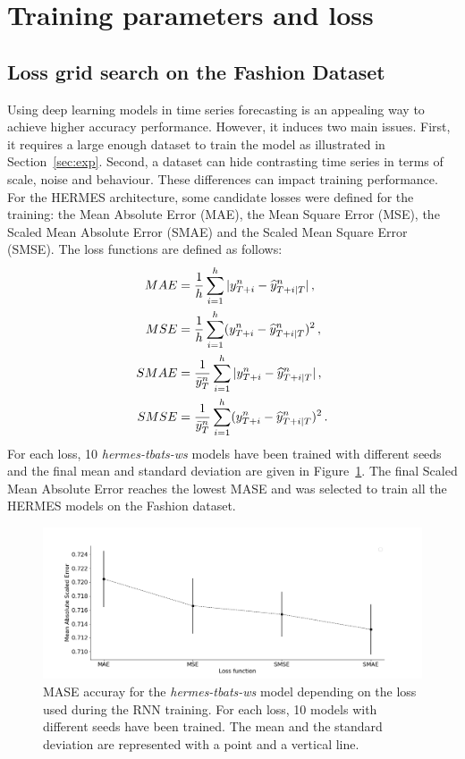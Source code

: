 \documentclass[10pt]{article} %
\newcommand{\ts}{y}
\newcommand{\tspred}{\widehat{\ts}}
\newcommand{\lag}{h}
\newcommand{\meants}{\Bar{\ts}}
\begin{document}
\section{Training parameters and loss}

\subsection{Loss grid search on the Fashion Dataset}
\label{sec:fashiongridsearch}

Using deep learning models in time series forecasting is an appealing way to achieve higher accuracy performance. However, it induces two main issues. First, it requires a large enough dataset to train the model as illustrated in Section~\ref{sec:exp}. Second, a dataset can hide contrasting time series in terms of scale, noise and behaviour. These differences can impact training performance. For the HERMES architecture, some candidate losses were defined for the training: the Mean Absolute Error (MAE), the Mean Square Error (MSE),  the Scaled Mean Absolute Error (SMAE) and the Scaled Mean Square Error (SMSE). The loss functions are defined as follows:
\begin{align*}
MAE &= \frac{1}{\lag}\sum_{i=1}^{\lag}|\ts^n_{T+i} - \tspred^n_{T+i|T}|\,,\\
MSE &= \frac{1}{\lag}\sum_{i=1}^{\lag}(\ts^n_{T+i} - \tspred^n_{T+i|T})^2\,,\\
SMAE &= \frac{1}{\meants^n_T}\sum_{i=1}^{\lag}|\ts^n_{T+i} - \tspred^n_{T+i|T}|\,,\\
SMSE &= \frac{1}{\meants^n_T}\sum_{i=1}^{\lag}(\ts^n_{T+i} - \tspred^n_{T+i|T})^2\,.
\end{align*}
For each loss, 10 \textit{hermes-tbats-ws} models have been trained with different seeds and the final mean and standard deviation are given in Figure~\ref{fig:loss_function}. The final Scaled Mean Absolute Error reaches the lowest MASE and was selected to train all the HERMES models on the Fashion dataset.

\begin{figure}
  \centering
    \includegraphics[width=1.\linewidth]{loss_function}
  \caption{MASE accuray for the \textit{hermes-tbats-ws} model depending on the loss used during the RNN training. For each loss, 10 models with different seeds have been trained. The mean and the standard deviation are represented with a point and a vertical line.}
\label{fig:loss_function}
\end{figure}
\end{document}

